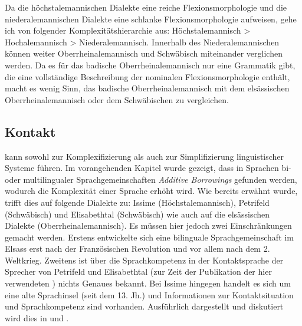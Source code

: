 Da die höchstalemannischen Dialekte eine reiche Flexionsmorphologie und die niederalemannischen Dialekte eine schlanke Flexionsmorphologie aufweisen, gehe ich von folgender Komplexitätshierarchie aus: Höchstalemannisch > Hochalemannisch > Niederalemannisch. Innerhalb des Niederalemannischen können weiter Oberrheinalemannisch und Schwäbisch miteinander verglichen werden. Da es für das badische Oberrheinalemannisch nur eine Grammatik gibt, die eine vollständige Beschreibung der nominalen Flexionsmorphologie enthält, macht es wenig Sinn, das badische Oberrheinalemannisch mit dem elsässischen Oberrheinalemannisch oder dem Schwäbischen zu vergleichen.

\subsection{Kontakt}\label{3.2.3}

 kann sowohl zur Komplexifizierung als auch zur Simplifizierung linguistischer Systeme führen. Im vorangehenden Kapitel wurde gezeigt, dass in Sprachen bi- oder multilingualer Sprachgemeinschaften \textit{Additive Borrowings} gefunden werden, wodurch die Komplexität einer Sprache erhöht wird. Wie bereits erwähnt wurde, trifft dies auf folgende Dialekte zu: Issime (Höchstalemannisch), Petrifeld (Schwäbisch) und Elisabethtal (Schwäbisch) wie auch auf die elsässischen Dialekte (Oberrheinalemannisch). Es müssen hier jedoch zwei Einschränkungen gemacht werden. Erstens entwickelte sich eine bilinguale Sprachgemeinschaft im Elsass erst nach der Französischen Revolution und vor allem nach dem 2. Weltkrieg. Zweitens ist über die Sprachkompetenz in der Kontaktsprache der Sprecher von Petrifeld und Elisabethtal (zur Zeit der Publikation der hier verwendeten ) nichts Genaues bekannt. Bei Issime hingegen handelt es sich um eine alte Sprachinsel (seit dem 13. Jh.) und Informationen zur Kontaktsituation und Sprachkompetenz sind vorhanden. Ausführlich dargestellt und diskutiert wird dies in  und .

